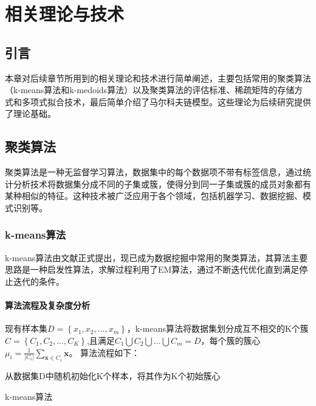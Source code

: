 \chapter{相关理论与技术}

\section{引言}

本章对后续章节所用到的相关理论和技术进行简单阐述，主要包括常用的聚类算法（k-means算法和k-medoids算法）以及聚类算法的评估标准、稀疏矩阵的存储方式和多项式拟合技术，最后简单介绍了马尔科夫链模型。这些理论为后续研究提供了理论基础。

\section{聚类算法}
聚类算法是一种无监督学习算法，数据集中的每个数据项不带有标签信息，通过统计分析技术将数据集分成不同的子集或簇，使得分到同一子集或簇的成员对象都有某种相似的特征。这种技术被广泛应用于各个领域，包括机器学习、数据挖掘、模式识别等。

\subsection{k-means算法}

k-means算法由文献\cite{hartigan1979algorithm}正式提出，现已成为数据挖掘中常用的聚类算法，其算法主要思路是一种启发性算法，求解过程利用了EM算法，通过不断迭代优化直到满足停止迭代的条件。

\subsubsection{算法流程及复杂度分析}

现有样本集$D=\left\{x_1,x_2,...,x_m\right\}$，k-means算法将数据集划分成互不相交的K个簇$C=\left\{C_1,C_2,...,C_K\right\}$,且满足$C_1\bigcup{C_2\bigcup{...\bigcup{C_m=D}}}$，每个簇的簇心$\mu _i=\frac{1}{|C_i|}\sum_{\mathbf{x}\in C_i}{\mathbf{x}}$。
算法流程如下：\\
\begin{algorithm}[H]
	\label{kmeans}
	 从数据集D中随机初始化K个样本，将其作为K个初始簇心\;
	 \caption{k-means算法}
\end{algorithm}

